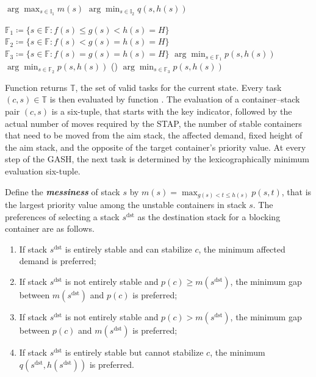 \documentclass[review,3p,times,12pt,number]{elsarticle}\usepackage{amsmath}\usepackage{amssymb}
\renewcommand{\gets}{\coloneqq}
\renewcommand{\emph}[1]{\textbf{\textit{#1}}}
\newcommand{\mds}{s^\mathrm{dst}}
\begin{document}
\begin{algorithm*}[htbp]
\begin{multicols}{2}
{  
  {
    \Return $\arg\max_{s\in\mathbb{I}_1} m(s)$\;
  }
  \Else
  {
    \Return $\arg\min_{s\in\mathbb{I}_2} q(s,h(s))$\;
  }
  
}




{
  $\mathbb{F}_1\gets \{s\in \mathbb{F}: f(s)\le g(s)<h(s)=H\}$\;
  $\mathbb{F}_2\gets \{s\in \mathbb{F}: f(s)< g(s)=h(s)=H\}$\;
  $\mathbb{F}_3\gets \{s\in \mathbb{F}: f(s)= g(s)=h(s)=H\}$\;
  {
    \Return $\arg\min_{s\in\mathbb{F}_1} p(s,h(s))$\;
  }
  {
    \Return $\arg\min_{s\in\mathbb{F}_2} p(s,h(s))$\;
  }
  \Else()
  {
    \Return $\arg\min_{s\in\mathbb{F}_3} p(s,h(s))$\;
  }
}

\end{multicols}
\BlankLine
\BlankLine
\end{algorithm*}



Function \Valid{} returns $\mathbb{T}$, the set of valid tasks for the current state. Every task $(c,s)\in\mathbb{T}$ is then evaluated by function . The evaluation of a container--stack pair $(c,s)$ is a six-tuple, that starts with the key indicator, followed by the actual number of moves required by the STAP, the number of  stable containers that need to be moved from the aim stack, the affected demand, fixed height of the aim stack, and the opposite of the target container's priority value. At every step of the GASH, the next task is determined by the lexicographically minimum evaluation six-tuple.


Define the \emph{messiness} of stack $s$ by $m(s)=\max_{g(s)<t\le h(s)}p(s,t)$, that is the largest priority value among the unstable containers in stack $s$. The preferences of selecting a stack $\mds$ as the destination stack for a blocking container are as follows.
\begin{enumerate}
\item If stack $\mds$ is entirely stable and can stabilize $c$, the minimum affected demand is preferred;
\item If stack $\mds$ is not entirely stable and $p(c)\ge m(\mds)$, the minimum gap between $m(\mds)$ and $p(c)$ is preferred;
\item If stack $\mds$ is not entirely stable and $p(c)> m(\mds)$, the minimum gap between $p(c)$ and $m(\mds)$ is preferred;
\item If stack $\mds$ is entirely stable but cannot stabilize $c$, the minimum $q(\mds,h(\mds))$ is preferred.
\end{enumerate}
\end{document}
